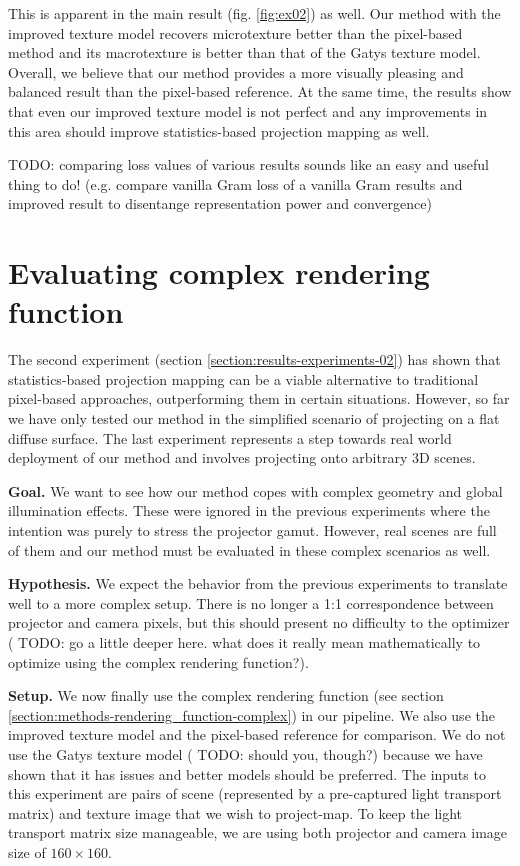 This is apparent in the main result (fig. \ref{fig:ex02}) as well. Our method with the improved texture model recovers microtexture better than the pixel-based method and its macrotexture is better than that of the Gatys texture model. Overall, we believe that our method provides a more visually pleasing and balanced result than the pixel-based reference. At the same time, the results show that even our improved texture model is not perfect and any improvements in this area should improve statistics-based projection mapping as well.

{\color{red} TODO: comparing loss values of various results sounds like an easy and useful thing to do! (e.g. compare vanilla Gram loss of a vanilla Gram results and improved result to disentange representation power and convergence)}

\section{Evaluating complex rendering function}
\label{section:results-experiments-03}

The second experiment (section \ref{section:results-experiments-02}) has shown that statistics-based projection mapping can be a viable alternative to traditional pixel-based approaches, outperforming them in certain situations. However, so far we have only tested our method in the simplified scenario of projecting on a flat diffuse surface. The last experiment represents a step towards real world deployment of our method and involves projecting onto arbitrary 3D scenes.

\textbf{Goal.} We want to see how our method copes with complex geometry and global illumination effects. These were ignored in the previous experiments where the intention was purely to stress the projector gamut. However, real scenes are full of them and our method must be evaluated in these complex scenarios as well.

\textbf{Hypothesis.} We expect the behavior from the previous experiments to translate well to a more complex setup. There is no longer a 1:1 correspondence between projector and camera pixels, but this should present no difficulty to the optimizer ({\color{red} TODO: go a little deeper here. what does it really mean mathematically to optimize using the complex rendering function?}).

\textbf{Setup.} We now finally use the complex rendering function (see section \ref{section:methods-rendering_function-complex}) in our pipeline. We also use the improved texture model and the pixel-based reference for comparison. We do not use the Gatys texture model ({\color{red} TODO: should you, though?}) because we have shown that it has issues and better models should be preferred. The inputs to this experiment are pairs of scene (represented by a pre-captured light transport matrix) and texture image that we wish to project-map. To keep the light transport matrix size manageable, we are using both projector and camera image size of \(160 \times 160\).

